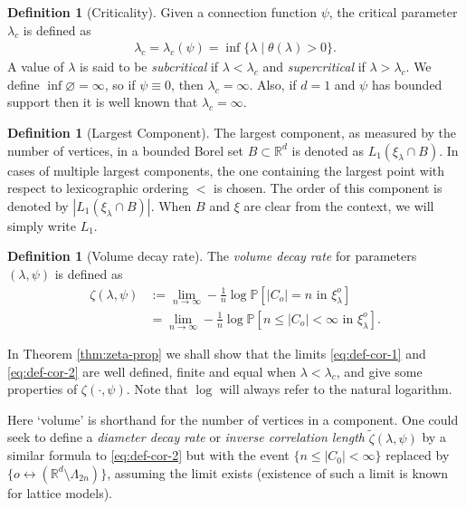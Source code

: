 \documentclass[a4paper,12pt]{scrartcl}
\newcommand{\conn}{\psi}
\renewcommand{\P}{\mathbb{P}}
\theoremstyle{definition}
\newtheorem{defi}[theorem]{Definition}
\theoremstyle{remark}
\begin{document}
\begin{defi}[Criticality]
  Given a connection function $\psi$, the critical parameter $\lambda_c$ is defined as
  \begin{align}
    \lambda_c = \lambda_c(\psi) = \inf\{\lambda \mid \theta(\lambda) > 0\}.
    \label{e:crit}
  \end{align}
  A value of $\lambda$ is said to be \emph{subcritical} if $\lambda < \lambda_c$ and \emph{supercritical} if $\lambda > \lambda_c$.
  We define $\inf \varnothing = \infty$, so if $\psi \equiv 0$, then $\lambda_c = \infty$. Also, if $d=1$ and $\psi $ has bounded support then
  it is well known that $\lambda_c = \infty$.
\end{defi}

\begin{defi}[Largest Component] \label{def:large-comp}
  The largest component, as measured by the number of vertices, in a bounded Borel set $B\subset \mathbb{R}^d$ is denoted as $L_1(\xi_{\lambda} \cap B)$. In cases of multiple largest components, the one containing the largest point with respect to lexicographic ordering $<$ is chosen. The order of this component is denoted by $|L_1(\xi_{\lambda} \cap B)|$. When $B$ and $\xi$ are clear from the context, we will simply write $L_1$.
\end{defi}

\begin{defi}[Volume decay rate] \label{def:cor-length}
  The {\em volume decay rate}
  for parameters $(\lambda, \conn)$ is defined as
  \begin{align}
    \zeta(\lambda, \conn)
    & :=
    \lim_{n\to\infty}
    -\frac1n \log \P[|C_o|= n\text{ in }\xi_{\lambda}^o] \label{eq:def-cor-1}
    \\
    & =
    \lim_{n\to\infty}
    -\frac1n \log \P[
      n\leq|C_o|< \infty \text{ in }\xi_{\lambda}^o \label{eq:def-cor-2}
    ].
  \end{align}
\end{defi}
In Theorem \ref{thm:zeta-prop} we shall show
that the limits \eqref{eq:def-cor-1} and \eqref{eq:def-cor-2} are well defined, finite and equal when $\lambda<\lambda_c$, and give some properties of $\zeta(\cdot,\psi)$.
Note that $\log$ will always refer to the natural logarithm.

Here `volume' is shorthand for the number of vertices in a component.
One could seek to define a {\em diameter decay rate}
or {\em inverse correlation length} $\tilde{\zeta}(\lambda, \psi)$
by a similar formula to \eqref{eq:def-cor-2} but with the event
$\{n \leq |C_0| < \infty\}$ replaced by
$\{o \leftrightarrow (\mathbb R^d \setminus \Lambda_{2n})\}$, assuming
the limit exists (existence of such a limit is known for lattice models).
\end{document}

